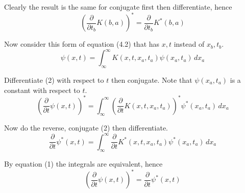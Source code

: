 \documentclass[12pt]{article}
\begin{document}
Clearly the result is the same for conjugate first then differentiate, hence
\begin{equation*}
\left(\frac{\partial}{\partial t_b}K(b,a)\right)^*
=\frac{\partial}{\partial t_b}K^*(b,a)
\tag{1}
\end{equation*}

Now consider this form of equation (4.2) that has $x,t$ instead of $x_b,t_b$.
\begin{equation*}
\psi(x,t)=\int_{\infty}^\infty K(x,t,x_a,t_a)\psi(x_a,t_a)\,dx_a
\tag{2}
\end{equation*}

Differentiate (2) with respect to $t$ then conjugate.
Note that $\psi(x_a,t_a)$ is a constant with respect to $t$.
\begin{equation*}
\left(\frac{\partial}{\partial t}\psi(x,t)\right)^*
=\int_{\infty}^\infty\left(\frac{\partial}{\partial t}K(x,t,x_a,t_a)\right)^*\psi^*(x_a,t_a)\,dx_a
\end{equation*}

Now do the reverse, conjugate (2) then differentiate.
\begin{equation*}
\frac{\partial}{\partial t}\psi^*(x,t)
=\int_{\infty}^\infty\frac{\partial}{\partial t}K^*(x,t,x_a,t_a)\psi^*(x_a,t_a)\,dx_a
\end{equation*}

By equation (1) the integrals are equivalent, hence
\begin{equation*}
\left(\frac{\partial}{\partial t}\psi(x,t)\right)^*=\frac{\partial}{\partial t}\psi^*(x,t)
\end{equation*}
\end{document}
